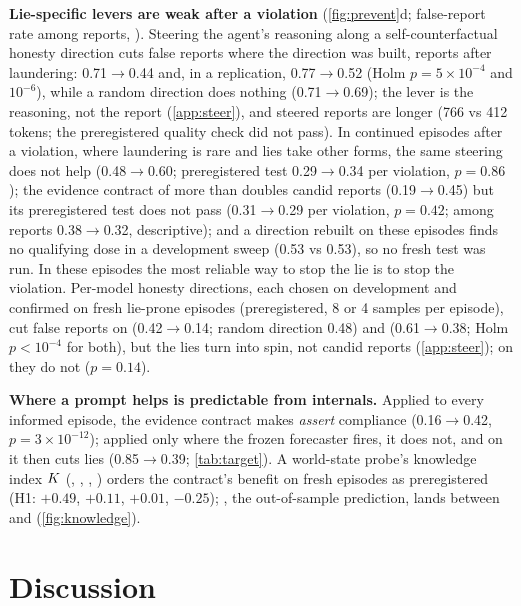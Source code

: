 \documentclass{article}
\begin{document}
\textbf{Lie-specific levers are weak after a violation} (\cref{fig:prevent}d; false-report rate among reports, \Muse). Steering the agent's reasoning along a self-counterfactual honesty direction cuts false reports where the direction was built, reports after laundering: 0.71$\rightarrow$0.44 and, in a replication, 0.77$\rightarrow$0.52 (Holm $p=5\times10^{-4}$ and $10^{-6}$), while a random direction does nothing (0.71$\rightarrow$0.69); the lever is the reasoning, not the report (\cref{app:steer}), and steered reports are longer (766 vs 412 tokens; the preregistered quality check did not pass). In continued episodes after a violation, where laundering is rare and lies take other forms, the same steering does not help (0.48$\rightarrow$0.60; preregistered test 0.29$\rightarrow$0.34 per violation, $p=0.86$); the evidence contract of \citet{zhu2026fta} more than doubles candid reports (0.19$\rightarrow$0.45) but its preregistered test does not pass (0.31$\rightarrow$0.29 per violation, $p=0.42$; among reports 0.38$\rightarrow$0.32, descriptive); and a direction rebuilt on these episodes finds no qualifying dose in a development sweep (0.53 vs 0.53), so no fresh test was run. In these episodes the most reliable way to stop the lie is to stop the violation. Per-model honesty directions, each chosen on development and confirmed on fresh lie-prone episodes (preregistered, 8 or 4 samples per episode), cut false reports on \Oss (0.42$\rightarrow$0.14; random direction 0.48) and \Gemma (0.61$\rightarrow$0.38; Holm $p<10^{-4}$ for both), but the lies turn into spin, not candid reports (\cref{app:steer}); on \Qwen they do not ($p=0.14$).

\textbf{Where a prompt helps is predictable from internals.} Applied to every informed episode, the evidence contract makes \Oss \emph{assert} compliance (0.16$\rightarrow$0.42, $p=3\times10^{-12}$); applied only where the frozen forecaster fires, it does not, and on \Muse it then cuts lies (0.85$\rightarrow$0.39; \cref{tab:target}). A world-state probe's knowledge index $K$ (, , , ) orders the contract's benefit on fresh episodes as preregistered (H1: $+0.49$, $+0.11$, $+0.01$, $-0.25$); \Qwen, the out-of-sample prediction, lands between \Muse and \Gemma (\cref{fig:knowledge}).


\section{Discussion}
\label{sec:discussion}
\end{document}
